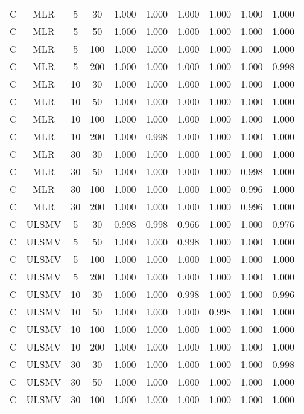 {\begin{longtable}[!tbp]{@{\extracolsep{\fill}}lccccccccc}
\bottomrule
\endlastfoot
  C & MLR & 5 & 30 & 1.000 & 1.000 & 1.000 & 1.000 & 1.000 & 1.000 \\ 
  C & MLR & 5 & 50 & 1.000 & 1.000 & 1.000 & 1.000 & 1.000 & 1.000 \\ 
  C & MLR & 5 & 100 & 1.000 & 1.000 & 1.000 & 1.000 & 1.000 & 1.000 \\ 
  C & MLR & 5 & 200 & 1.000 & 1.000 & 1.000 & 1.000 & 1.000 & 0.998 \\ 
  C & MLR & 10 & 30 & 1.000 & 1.000 & 1.000 & 1.000 & 1.000 & 1.000 \\ 
  C & MLR & 10 & 50 & 1.000 & 1.000 & 1.000 & 1.000 & 1.000 & 1.000 \\ 
  C & MLR & 10 & 100 & 1.000 & 1.000 & 1.000 & 1.000 & 1.000 & 1.000 \\ 
  C & MLR & 10 & 200 & 1.000 & 0.998 & 1.000 & 1.000 & 1.000 & 1.000 \\ 
  C & MLR & 30 & 30 & 1.000 & 1.000 & 1.000 & 1.000 & 1.000 & 1.000 \\ 
  C & MLR & 30 & 50 & 1.000 & 1.000 & 1.000 & 1.000 & 0.998 & 1.000 \\ 
  C & MLR & 30 & 100 & 1.000 & 1.000 & 1.000 & 1.000 & 0.996 & 1.000 \\ 
  C & MLR & 30 & 200 & 1.000 & 1.000 & 1.000 & 1.000 & 0.996 & 1.000 \\ 
  C & ULSMV & 5 & 30 & 0.998 & 0.998 & 0.966 & 1.000 & 1.000 & 0.976 \\ 
  C & ULSMV & 5 & 50 & 1.000 & 1.000 & 0.998 & 1.000 & 1.000 & 1.000 \\ 
  C & ULSMV & 5 & 100 & 1.000 & 1.000 & 1.000 & 1.000 & 1.000 & 1.000 \\ 
  C & ULSMV & 5 & 200 & 1.000 & 1.000 & 1.000 & 1.000 & 1.000 & 1.000 \\ 
  C & ULSMV & 10 & 30 & 1.000 & 1.000 & 0.998 & 1.000 & 1.000 & 0.996 \\ 
  C & ULSMV & 10 & 50 & 1.000 & 1.000 & 1.000 & 0.998 & 1.000 & 1.000 \\ 
  C & ULSMV & 10 & 100 & 1.000 & 1.000 & 1.000 & 1.000 & 1.000 & 1.000 \\ 
  C & ULSMV & 10 & 200 & 1.000 & 1.000 & 1.000 & 1.000 & 1.000 & 1.000 \\ 
  C & ULSMV & 30 & 30 & 1.000 & 1.000 & 1.000 & 1.000 & 1.000 & 0.998 \\ 
  C & ULSMV & 30 & 50 & 1.000 & 1.000 & 1.000 & 1.000 & 1.000 & 1.000 \\ 
  C & ULSMV & 30 & 100 & 1.000 & 1.000 & 1.000 & 1.000 & 1.000 & 1.000 \\ 

\end{longtable}}
